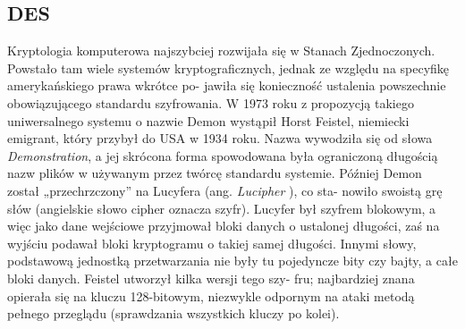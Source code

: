 \documentclass[a4paper]{article}
\begin{document}
\subsection{DES}
Kryptologia komputerowa najszybciej rozwijała się w Stanach Zjednoczonych. Powstało tam wiele
systemów kryptograficznych, jednak ze względu na specyfikę amerykańskiego prawa wkrótce po-
jawiła się konieczność ustalenia powszechnie obowiązującego standardu szyfrowania. W 1973 roku
z propozycją takiego uniwersalnego systemu o nazwie Demon wystąpił Horst Feistel, niemiecki
emigrant, który przybył do USA w 1934 roku. Nazwa wywodziła się od słowa \textit{Demonstration}, a jej
skrócona forma spowodowana była ograniczoną długością nazw plików w używanym przez twórcę standardu systemie. Później Demon został „przechrzczony” na Lucyfera (ang. \textit{Lucipher} ), co sta-
nowiło swoistą grę słów (angielskie słowo cipher oznacza szyfr). Lucyfer był szyfrem blokowym, a
więc jako dane wejściowe przyjmował bloki danych o ustalonej długości, zaś na wyjściu podawał
bloki kryptogramu o takiej samej długości. Innymi słowy, podstawową jednostką przetwarzania
nie były tu pojedyncze bity czy bajty, a całe bloki danych. Feistel utworzył kilka wersji tego szy-
fru; najbardziej znana opierała się na kluczu 128-bitowym, niezwykle odpornym na ataki metodą
pełnego przeglądu (sprawdzania wszystkich kluczy po kolei).
\end{document}
